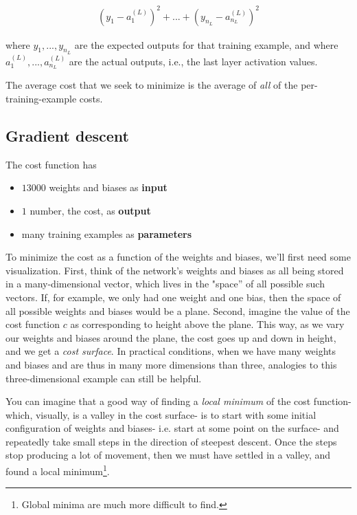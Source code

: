 \documentclass{article}
\begin{document}
	\begin{align*}
		(y_1 - a^{(L)}_1)^2 + ... + (y_{n_L} - a^{(L)}_{n_L})^2 
	\end{align*}
	
	where $y_1, ..., y_{n_L}$ are the expected outputs for that training example, and where $a^{(L)}_1, ..., a^{(L)}_{n_L}$ are the actual outputs, i.e., the last layer activation values.
	
	The average cost that we seek to minimize is the average of \textit{all} of the per-training-example costs.
	
	\subsection*{Gradient descent}
	
	The cost function has
	
	\begin{itemize}
		\item $13000$ weights and biases as \textbf{input}
		\item $1$ number, the cost, as \textbf{output}
		\item many training examples as \textbf{parameters}
	\end{itemize}
	
	To minimize the cost as a function of the weights and biases, we'll first need some visualization. First, think of the network's weights and biases as all being stored in a many-dimensional vector, which lives in the "space'' of all possible such vectors. If, for example, we only had one weight and one bias, then the space of all possible weights and biases would be a plane. Second, imagine the value of the cost function $c$ as corresponding to height above the plane. This way, as we vary our weights and biases around the plane, the cost goes up and down in height, and we get a \textit{cost surface}. In practical conditions, when we have many weights and biases and are thus in many more dimensions than three, analogies to this three-dimensional example can still be helpful.
	
	You can imagine that a good way of finding a \textit{local minimum} of the cost function- which, visually, is a valley in the cost surface- is to start with some initial configuration of weights and biases- i.e. start at some point on the surface- and repeatedly take small steps in the direction of steepest descent. Once the steps stop producing a lot of movement, then we must have settled in a valley, and found a local minimum\footnote{Global minima are much more difficult to find.}. 
	
\end{document}
